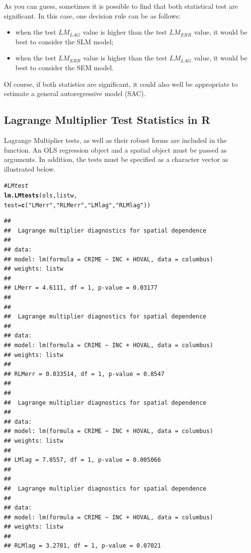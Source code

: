 \documentclass[english,12pt]{book}\usepackage[]{graphicx}\usepackage[]{xcolor}
\makeatletter
\newcommand{\hlstr}[1]{\textcolor[rgb]{0.192,0.494,0.8}{#1}}%
\newcommand{\hlcom}[1]{\textcolor[rgb]{0.678,0.584,0.686}{\textit{#1}}}%
\newcommand{\hlstd}[1]{\textcolor[rgb]{0.345,0.345,0.345}{#1}}%
\newcommand{\hlkwc}[1]{\textcolor[rgb]{0.333,0.667,0.333}{#1}}%
\newcommand{\hlkwd}[1]{\textcolor[rgb]{0.737,0.353,0.396}{\textbf{#1}}}%
\newenvironment{kframe}{%
 \def\at@end@of@kframe{}%
 \ifinner\ifhmode%
  \def\at@end@of@kframe{\end{minipage}}%
  \begin{minipage}{\columnwidth}%
 \fi\fi%
 \def\FrameCommand##1{\hskip\@totalleftmargin \hskip-\fboxsep
 \colorbox{shadecolor}{##1}\hskip-\fboxsep
     \hskip-\linewidth \hskip-\@totalleftmargin \hskip\columnwidth}%
 \MakeFramed {\advance\hsize-\width
   \@totalleftmargin\z@ \linewidth\hsize
   \@setminipage}}%
 {\par\unskip\endMakeFramed%
 \at@end@of@kframe}
\newenvironment{knitrout}{}{} %
\makeatother
\begin{document}
As you can guess, sometimes it is possible to find that both statistical test are significant. In this case, one decision rule can be as follows:

\begin{itemize}
  \item when the test $LM_{LAG}$ value is higher than the test $LM_{ERR}$ value, it would be best to consider the SLM model;
  \item when the test $LM_{ERR}$ value is higher than the test $LM_{LAG}$ value, it would be best to consider the SEM model. 
\end{itemize}

Of course, if both statistics are significant, it could also well be appropriate to estimate a general autoregressive model (SAC).

\subsection{Lagrange Multiplier Test Statistics in R}


Lagrange Multiplier tests, as well as their robust forms are included in the  function. An OLS regression object and a spatial  object must be passed as arguments. In addition, the tests must be specified as a character vector as illustrated below.


\begin{knitrout}
\color{fgcolor}\begin{kframe}
\begin{alltt}
\hlcom{# LM test}
\hlkwd{lm.LMtests}\hlstd{(ols, listw,}
           \hlkwc{test} \hlstd{=} \hlkwd{c}\hlstd{(}\hlstr{"LMerr"}\hlstd{,} \hlstr{"RLMerr"}\hlstd{,} \hlstr{"LMlag"}\hlstd{,} \hlstr{"RLMlag"}\hlstd{))}
\end{alltt}
\begin{verbatim}
## 
## 	Lagrange multiplier diagnostics for spatial dependence
## 
## data:  
## model: lm(formula = CRIME ~ INC + HOVAL, data = columbus)
## weights: listw
## 
## LMerr = 4.6111, df = 1, p-value = 0.03177
## 
## 
## 	Lagrange multiplier diagnostics for spatial dependence
## 
## data:  
## model: lm(formula = CRIME ~ INC + HOVAL, data = columbus)
## weights: listw
## 
## RLMerr = 0.033514, df = 1, p-value = 0.8547
## 
## 
## 	Lagrange multiplier diagnostics for spatial dependence
## 
## data:  
## model: lm(formula = CRIME ~ INC + HOVAL, data = columbus)
## weights: listw
## 
## LMlag = 7.8557, df = 1, p-value = 0.005066
## 
## 
## 	Lagrange multiplier diagnostics for spatial dependence
## 
## data:  
## model: lm(formula = CRIME ~ INC + HOVAL, data = columbus)
## weights: listw
## 
## RLMlag = 3.2781, df = 1, p-value = 0.07021
\end{verbatim}
\end{kframe}
\end{knitrout}
\end{document}
